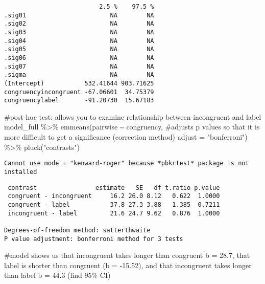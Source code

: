 \documentclass[
  letterpaper,
  DIV=11,
  numbers=noendperiod]{scrartcl}
\newenvironment{Shaded}{\begin{snugshade}}{\end{snugshade}}
\newcommand{\AttributeTok}[1]{\textcolor[rgb]{0.40,0.45,0.13}{#1}}
\newcommand{\CommentTok}[1]{\textcolor[rgb]{0.37,0.37,0.37}{#1}}
\newcommand{\FunctionTok}[1]{\textcolor[rgb]{0.28,0.35,0.67}{#1}}
\newcommand{\NormalTok}[1]{\textcolor[rgb]{0.00,0.23,0.31}{#1}}
\newcommand{\SpecialCharTok}[1]{\textcolor[rgb]{0.37,0.37,0.37}{#1}}
\newcommand{\StringTok}[1]{\textcolor[rgb]{0.13,0.47,0.30}{#1}}
\begin{document}
\begin{verbatim}
                          2.5 %    97.5 %
.sig01                       NA        NA
.sig02                       NA        NA
.sig03                       NA        NA
.sig04                       NA        NA
.sig05                       NA        NA
.sig06                       NA        NA
.sig07                       NA        NA
.sigma                       NA        NA
(Intercept)           532.41644 903.71625
congruencyincongruent -67.06601  34.75379
congruencylabel       -91.20730  15.67183
\end{verbatim}

\begin{Shaded}
\begin{Highlighting}[]
\CommentTok{\#post{-}hoc test: allows you to examine relationship between incongruent and label}
\NormalTok{model\_full }\SpecialCharTok{\%\textgreater{}\%} 
  \FunctionTok{emmeans}\NormalTok{(pairwise }\SpecialCharTok{\textasciitilde{}}\NormalTok{ congruency,}
          \CommentTok{\#adjusts p values so that it is more difficult to get a significance (correction method)}
          \AttributeTok{adjust =} \StringTok{"bonferroni"}\NormalTok{) }\SpecialCharTok{\%\textgreater{}\%} 
  \FunctionTok{pluck}\NormalTok{(}\StringTok{"contrasts"}\NormalTok{)}
\end{Highlighting}
\end{Shaded}

\begin{verbatim}
Cannot use mode = "kenward-roger" because *pbkrtest* package is not installed
\end{verbatim}

\begin{verbatim}
 contrast                estimate   SE   df t.ratio p.value
 congruent - incongruent     16.2 26.0 8.12   0.622  1.0000
 congruent - label           37.8 27.3 3.88   1.385  0.7211
 incongruent - label         21.6 24.7 9.62   0.876  1.0000

Degrees-of-freedom method: satterthwaite 
P value adjustment: bonferroni method for 3 tests 
\end{verbatim}

\begin{Shaded}
\begin{Highlighting}[]
\CommentTok{\#model shows us that incongruent takes longer than congruent b = 28.7, that label is shorter than congruent (b = {-}15.52), and that incongruent takes longer than label b = 44.3 (find 95\% CI) }
\end{Highlighting}
\end{Shaded}
\end{document}
